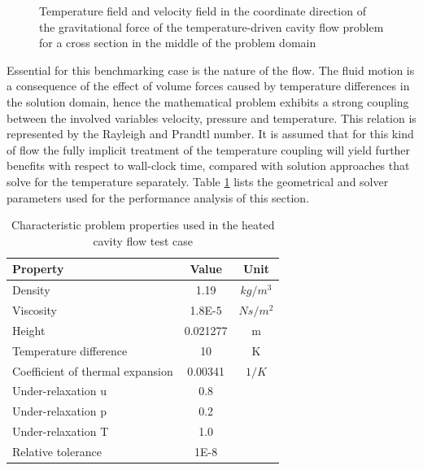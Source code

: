 \begin{figure}[h!]
{\begin{minipage}{0.45\textwidth}
\end{minipage} }
  \caption{Temperature field and velocity field in the coordinate direction of the gravitational force of the temperature-driven cavity flow problem for a cross section in the middle of the problem domain }
  \label{fig:sketchcavity}
\end{figure}

Essential for this benchmarking case is the nature of the flow. The fluid motion is a consequence of the effect of volume forces caused by temperature differences in the solution domain, hence the mathematical problem exhibits a strong coupling between the involved variables velocity, pressure and temperature. This relation is represented by the Rayleigh and Prandtl number. It is assumed that for this kind of flow the fully implicit treatment of the temperature coupling will yield further benefits with respect to wall-clock time, compared with solution approaches that solve for the temperature separately. Table \ref{tab:cavity} lists the geometrical and solver parameters used for the performance analysis of this section.

\begin{table}[h!]\centering
  \caption{Characteristic problem properties used in the heated cavity flow test case}
  \begin{tabular}{lcc}\toprule
    Property & Value & Unit \\
    \midrule
    \rowcolor{black!20} Density            & 1.19      & $kg/m^3$  \\
    \rowcolor{black!00} Viscosity          & 1.8E-5    & $Ns/m^2$  \\
    \rowcolor{black!20} Height             & 0.021277  & m         \\
    \rowcolor{black!00} Temperature difference & 10    & K         \\
    \rowcolor{black!20} Coefficient of thermal expansion & 0.00341 & $1/K$ \\
    \rowcolor{black!00} Under-relaxation u & 0.8       &           \\
    \rowcolor{black!20} Under-relaxation p & 0.2       &           \\
    \rowcolor{black!00} Under-relaxation T & 1.0       &           \\
    \rowcolor{black!20} Relative tolerance & 1E-8      &
  \end{tabular}
  \label{tab:cavity}
\end{table}

